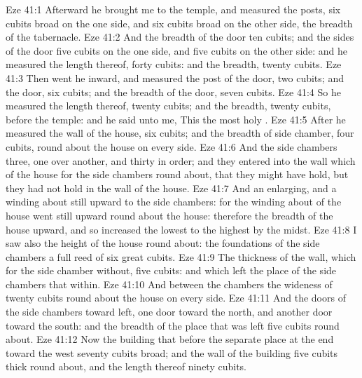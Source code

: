\vs Eze 41:1 Afterward he brought me to the temple, and measured the posts, six cubits broad on the one side, and six cubits broad on the other side,  the breadth of the tabernacle.
\vs Eze 41:2 And the breadth of the door  ten cubits; and the sides of the door  five cubits on the one side, and five cubits on the other side: and he measured the length thereof, forty cubits: and the breadth, twenty cubits.
\vs Eze 41:3 Then went he inward, and measured the post of the door, two cubits; and the door, six cubits; and the breadth of the door, seven cubits.
\vs Eze 41:4 So he measured the length thereof, twenty cubits; and the breadth, twenty cubits, before the temple: and he said unto me, This  the most holy .
\vs Eze 41:5 After he measured the wall of the house, six cubits; and the breadth of  side chamber, four cubits, round about the house on every side.
\vs Eze 41:6 And the side chambers  three, one over another, and thirty in order; and they entered into the wall which  of the house for the side chambers round about, that they might have hold, but they had not hold in the wall of the house.
\vs Eze 41:7 And  an enlarging, and a winding about still upward to the side chambers: for the winding about of the house went still upward round about the house: therefore the breadth of the house  upward, and so increased  the lowest  to the highest by the midst.
\vs Eze 41:8 I saw also the height of the house round about: the foundations of the side chambers  a full reed of six great cubits.
\vs Eze 41:9 The thickness of the wall, which  for the side chamber without,  five cubits: and  which  left  the place of the side chambers that  within.
\vs Eze 41:10 And between the chambers  the wideness of twenty cubits round about the house on every side.
\vs Eze 41:11 And the doors of the side chambers  toward  left, one door toward the north, and another door toward the south: and the breadth of the place that was left  five cubits round about.
\vs Eze 41:12 Now the building that  before the separate place at the end toward the west  seventy cubits broad; and the wall of the building  five cubits thick round about, and the length thereof ninety cubits.
